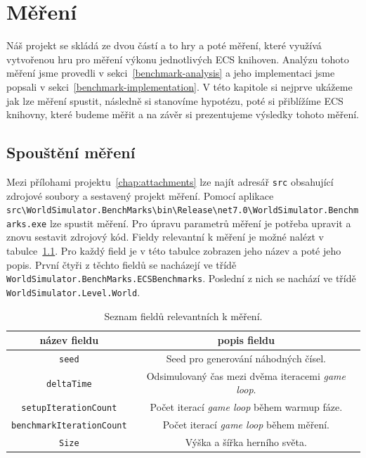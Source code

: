 \chapter{Měření}
\label{chap:benchmark}
Náš projekt se skládá ze dvou částí a to hry a poté měření, které využívá vytvořenou hru pro měření výkonu jednotlivých ECS knihoven. Analýzu tohoto měření jsme provedli v sekci~\ref{benchmark-analysis} a jeho implementaci jsme popsali v sekci~\ref{benchmark-implementation}. V této kapitole si nejprve ukážeme jak lze měření spustit, následně si stanovíme hypotézu, poté si přiblížíme ECS knihovny, které budeme měřit a na závěr si prezentujeme výsledky tohoto měření.

\section{Spouštění měření}
Mezi přílohami projektu~\ref{chap:attachments} lze najít adresář \texttt{src} obsahující zdrojové soubory a sestavený projekt měření. Pomocí aplikace \texttt{src\textbackslash WorldSimulator.BenchMarks\textbackslash bin\textbackslash Release\textbackslash net7.0\textbackslash WorldSimulator.Benchmarks.exe} lze spustit měření. Pro úpravu parametrů měření je potřeba upravit a znovu sestavit zdrojový kód. Fieldy relevantní k měření je možné nalézt v tabulce~\ref{tab:benchmark-relevant-fields}. Pro každý field je v této tabulce zobrazen jeho název a poté jeho popis. První čtyři z těchto fieldů se nacházejí ve třídě \texttt{WorldSimulator.BenchMarks.ECSBenchmarks}. Poslední z nich se nachází ve třídě \texttt{WorldSimulator.Level.World}.

\begin{table}[!htb]
    \centering\footnotesize\sf
    \begin{tabular}{c c}
        \toprule
        název fieldu & popis fieldu \\
        \midrule

        \texttt{seed} & Seed pro generování náhodných čísel. \\

        \texttt{deltaTime} & Odsimulovaný čas mezi dvěma iteracemi \textit{game loop}. \\

        \texttt{setupIterationCount} & Počet iterací \textit{game loop} během warmup fáze. \\

        \texttt{benchmarkIterationCount} & Počet iterací \textit{game loop} během měření. \\

        \texttt{Size} & Výška a šířka herního světa. \\
        \bottomrule
    \end{tabular}
    \caption{Seznam fieldů relevantních k měření.}
    \label{tab:benchmark-relevant-fields}
\end{table}

